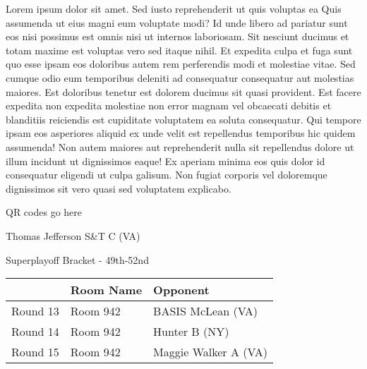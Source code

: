 \documentclass{article}%
\begin{document}
\vspace*{8pt}%
\linebreak%
\newline%
\newline%
Lorem ipsum dolor sit amet. Sed iusto reprehenderit ut quis voluptas ea Quis assumenda ut eius magni eum voluptate modi? Id unde libero ad pariatur sunt eos nisi possimus est omnis nisi ut internos laboriosam. Sit nesciunt ducimus et totam maxime est voluptas vero sed itaque nihil. Et expedita culpa et fuga sunt quo esse ipsam eos doloribus autem rem perferendis modi et molestiae vitae.\newline%
\newline%
Sed cumque odio eum temporibus deleniti ad consequatur consequatur aut molestias maiores. Est doloribus tenetur est dolorem ducimus sit quasi provident. Est facere expedita non expedita molestiae non error magnam vel obcaecati debitis et blanditiis reiciendis est cupiditate voluptatem ea soluta consequatur. Qui tempore ipsam eos asperiores aliquid ex unde velit est repellendus temporibus hic quidem assumenda!\newline%
\newline%
Non autem maiores aut reprehenderit nulla sit repellendus dolore ut illum incidunt ut dignissimos eaque! Ex aperiam minima eos quis dolor id consequatur eligendi ut culpa galisum. Non fugiat corporis vel doloremque dignissimos sit vero quasi sed voluptatem explicabo.\newline%
\newline%
%
\vspace*{30pt}%
\begin{center}%
\begin{Huge}%
QR codes go here%
\end{Huge}%
\end{center}%
\newpage%
\begin{center}%
\begin{Huge}%
Thomas Jefferson S\&T C (VA)%
\end{Huge}%
\vspace*{8pt}%
\linebreak%
\begin{Large}%
Superplayoff Bracket {-} 49th{-}52nd%
\end{Large}%
\end{center}%
%
\begin{tabularx}{\textwidth}{|c|Y|Y|}%
\hline%
&Room Name&Opponent\\%
\hline%
Round 13&Room 942&BASIS McLean (VA)\\%
Round 14&Room 942&Hunter B (NY)\\%
Round 15&Room 942&Maggie Walker A (VA)\\%
\hline%
\end{tabularx}%
\end{document}

